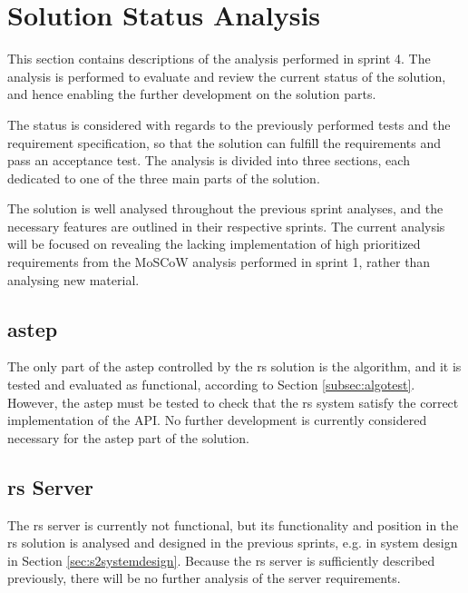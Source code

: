 \section{Solution Status Analysis}
This section contains descriptions of the analysis performed in sprint 4.
The analysis is performed to evaluate and review the current status of the solution, and hence enabling the further development on the solution parts.

The status is considered with regards to the previously performed tests and the requirement specification, so that the solution can fulfill the requirements and pass an acceptance test.
The analysis is divided into three sections, each dedicated to one of the three main parts of the solution.

The solution is well analysed throughout the previous sprint analyses, and the necessary features are outlined in their respective sprints.
The current analysis will be focused on revealing the lacking implementation of high prioritized requirements from the MoSCoW analysis performed in sprint 1, rather than analysing new material.


\subsection{\gls{astep}}
The only part of the \gls{astep} controlled by the \gls{rs} solution is the algorithm, and it is tested and evaluated as functional, according to Section \ref{subsec:algotest}. 
However, the \gls{astep} must be tested to check that the \gls{rs} system satisfy the correct implementation of the API.
No further development is currently considered necessary for the \gls{astep} part of the solution.


\subsection{\gls{rs} Server}
The \gls{rs} server is currently not functional, but its functionality and position in the \gls{rs} solution is analysed and designed in the previous sprints, e.g. in system design in Section \ref{sec:s2systemdesign}. Because the \gls{rs} server is sufficiently described previously, there will be no further analysis of the server requirements.

